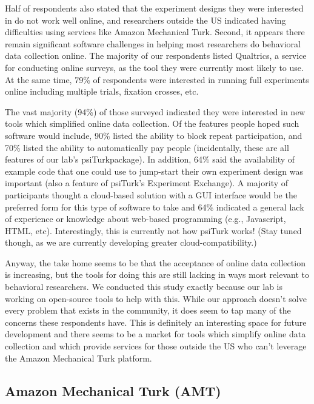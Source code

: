 \documentclass[jou,apacite]{apa6}
\begin{document}
Half of respondents also stated that the experiment designs they were interested in do not work well online, and researchers outside the US indicated having difficulties using services like Amazon Mechanical Turk.
Second, it appears there remain significant software challenges in helping most researchers do behavioral data collection online.
The majority of our respondents listed Qualtrics, a service for conducting online surveys, as the tool they were currently most likely to use.
At the same time, 79\% of respondents were interested in running full experiments online including multiple trials, fixation crosses, etc.

The vast majority (94\%) of those surveyed indicated they were interested in new tools which simplified online data collection.
Of the features people hoped such software would include, 90\% listed the ability to block repeat participation, and 70\% listed the ability to automatically pay people (incidentally, these are all features of our lab's psiTurkpackage).
In addition, 64\% said the availability of example code that one could use to jump-start their own experiment design was important (also a feature of psiTurk's Experiment Exchange).
A majority of participants thought a cloud-based solution with a GUI interface would be the preferred form for this type of software to take and 64\% indicated a general lack of experience or knowledge about web-based programming (e.g., Javascript, HTML, etc).
Interestingly, this is currently not how psiTurk works! (Stay tuned though, as we are currently developing greater cloud-compatibility.)

Anyway, the take home seems to be that the acceptance of online data collection is increasing, but the tools for doing this are still lacking in ways most relevant to behavioral researchers.
We conducted this study exactly because our lab is working on open-source tools to help with this.
While our approach doesn't solve every problem that exists in the community, it does seem to tap many of the concerns these respondents have.
This is definitely an interesting space for future development and there seems to be a market for tools which simplify online data collection and which provide services for those outside the US who can't leverage the Amazon Mechanical Turk platform.


\subsection{Amazon Mechanical Turk (AMT)} 
\end{document}
